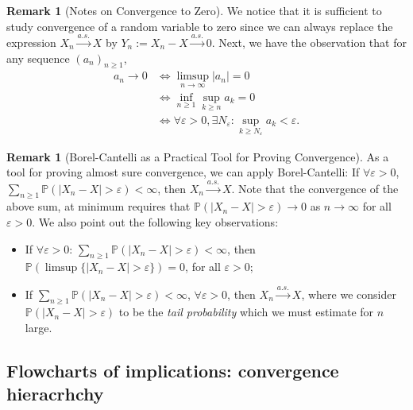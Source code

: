 \documentclass[12pt,reqno]{article}
\renewcommand{\emph}[1]{\textit{#1}}
\theoremstyle{plain}
\theoremstyle{definition}
\newtheorem{remark}[theorem]{Remark}
\newcommand{\PP}[1]{\ensuremath{\mathbb{P}\left(#1\right)}}
\begin{document}
\begin{remark}[Notes on Convergence to Zero]
We notice that it is sufficient to study convergence of a random variable to zero 
since we can always replace the expression $X_n \xrightarrow{a.s.} X$ by 
$Y_n := X_n-X \xrightarrow{a.s.} 0$. Next, we have the observation that for any 
sequence $(a_n)_{n \geq 1}$, 
\begin{align*} 
a_n \longrightarrow 0 & \iff \limsup_{n \rightarrow \infty} |a_n| = 0 \\ 
     & \iff \inf_{n \geq 1} \sup_{k \geq n} a_k = 0 \\ 
     & \iff \forall \varepsilon > 0, \exists N_{\varepsilon}: 
     \sup_{k \geq N_{\varepsilon}} a_k < \varepsilon. 
\end{align*} 
\end{remark} 

\begin{remark}[Borel-Cantelli as a Practical Tool for Proving Convergence]
As a tool for proving almost sure convergence, we can apply 
Borel-Cantelli: If $\forall \varepsilon > 0$, 
$\sum_{n \geq 1} \mathbb{P}(|X_n-X| > \varepsilon) < \infty$, then 
$X_n \xrightarrow{a.s.} X$. Note that the convergence of the above sum, 
at minimum requires that 
$\mathbb{P}(|X_n-X| > \varepsilon) \rightarrow 0$ as $n \rightarrow \infty$ 
for all $\varepsilon > 0$. We also point out the following key observations:
\begin{itemize} 

\item If $\forall \varepsilon > 0$: $\sum_{n \geq 1} \PP{|X_n-X| > \varepsilon} < \infty$, 
     then $\PP{\limsup \{|X_n-X| > \varepsilon\}} = 0$, for all $\varepsilon > 0$; 
\item If $\sum_{n \geq 1} \PP{|X_n-X| > \varepsilon} < \infty$, $\forall \varepsilon > 0$, 
      then $X_n \xrightarrow{a.s.} X$, where we consider $\PP{|X_n-X| > \varepsilon}$ to be 
      the \emph{tail probability} which we must estimate for $n$ large. 

\end{itemize} 
\end{remark} 

\subsection{Flowcharts of implications: convergence hieracrhchy} 
\end{document}
